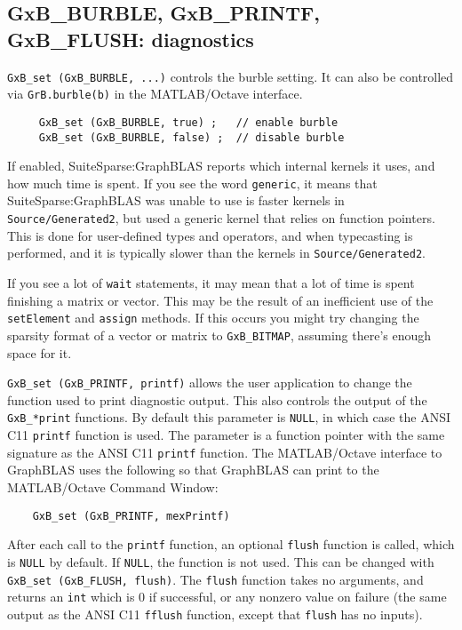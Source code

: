 \documentclass[12pt]{article}
\begin{document}
\subsection{{\sf GxB\_BURBLE}, {\sf GxB\_PRINTF}, {\sf GxB\_FLUSH}: diagnostics}

\verb'GxB_set (GxB_BURBLE, ...)' controls the burble setting.  It can also be
controlled via \verb'GrB.burble(b)' in the MATLAB/Octave interface.

{\footnotesize
\begin{verbatim}
     GxB_set (GxB_BURBLE, true) ;   // enable burble
     GxB_set (GxB_BURBLE, false) ;  // disable burble \end{verbatim}}

If enabled, SuiteSparse:GraphBLAS reports which internal kernels it uses, and
how much time is spent.  If you see the word \verb'generic', it means that
SuiteSparse:GraphBLAS was unable to use is faster kernels in
\verb'Source/Generated2', but used a generic kernel that relies on function
pointers.  This is done for user-defined types and operators, and when
typecasting is performed, and it is typically slower than the kernels in
\verb'Source/Generated2'.

If you see a lot of \verb'wait' statements, it may mean that a lot of time is
spent finishing a matrix or vector.  This may be the result of an inefficient
use of the \verb'setElement' and \verb'assign' methods.  If this occurs you
might try changing the sparsity format of a vector or matrix to
\verb'GxB_BITMAP', assuming there's enough space for it.

\verb'GxB_set (GxB_PRINTF, printf)' allows the user application to change the
function used to print diagnostic output.  This also controls the output of the
\verb'GxB_*print' functions.  By default this parameter is \verb'NULL', in
which case the ANSI C11 \verb'printf' function is used.  The parameter is a
function pointer with the same signature as the ANSI C11 \verb'printf'
function.  The MATLAB/Octave interface to GraphBLAS uses the following so that
GraphBLAS can print to the MATLAB/Octave Command Window:

{\footnotesize
\begin{verbatim}
    GxB_set (GxB_PRINTF, mexPrintf) \end{verbatim}}

After each call to the \verb'printf' function, an optional
\verb'flush' function is called, which is \verb'NULL' by default.  If
\verb'NULL', the function is not used.  This can be changed with
\verb'GxB_set (GxB_FLUSH, flush)'.  The \verb'flush' function takes no
arguments, and returns an \verb'int' which is 0 if successful, or any nonzero
value on failure (the same output as the ANSI C11 \verb'fflush' function,
except that \verb'flush' has no inputs).
\end{document}
